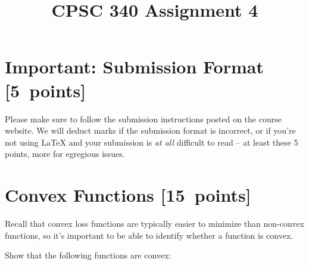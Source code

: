 \documentclass{article}
\newcommand{\blu}[1]{{\textcolor{blu}{#1}}}
\let\ask\blu
\newcommand\pts[1]{\textcolor{pointscolour}{[#1~points]}}
\begin{document}
\title{CPSC 340 Assignment 4}
\date{}
\maketitle

\vspace{-4em}

\section*{Important: Submission Format \pts{5}}

    Please make sure to follow the submission instructions posted on the course website.
    \ask{We will deduct marks if the submission format is incorrect, or if you're not using \LaTeX{} and your submission is \emph{at all} difficult to read} -- at least these 5 points, more for egregious issues.

\section{Convex Functions \pts{15}}

Recall that convex loss functions are typically easier to minimize than non-convex functions, so it's important to be able to identify whether a function is convex.

\ask{Show that the following functions are convex}:
\end{document}
